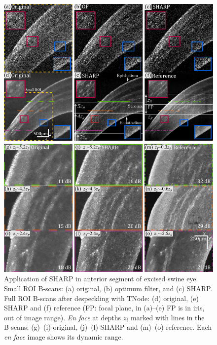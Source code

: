 \begin{figure}[htb!]
	\centering
	\includegraphics[width=\textwidth]{Figures/Results/ASImaging.pdf}
	\caption[Application of SHARP in anterior segment of excised swine eye.]{Application of SHARP in anterior segment of excised swine eye. Small ROI B-scans: (a) original, (b) optimum filter, and (c) SHARP. Full ROI B-scans after despeckling with TNode: (d) original, (e) SHARP and (f) reference (FP: focal plane, in (a)--(e) FP is in iris, out of image range). \textit{En face} at depths $z_i$ marked with lines in the B-scans: (g)--(i) original, (j)--(l) SHARP and (m)--(o) reference. Each \textit{en face} image shows its dynamic range.}
	\label{fig:ASImaging}
\end{figure}

